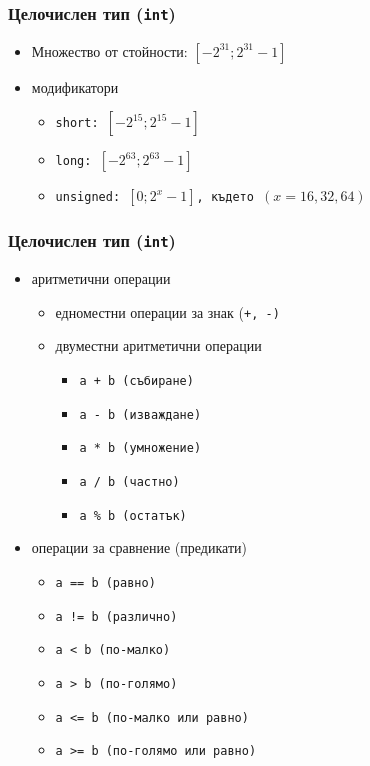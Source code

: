 \documentclass[alsotrans]{beamerswitch}
\begin{document}
\begin{frame}
  \frametitle{Целочислен тип (\texttt{int})}
  \begin{itemize}
  \item Множество от стойности: $[-2^{31}; 2^{31}-1]$
  \item модификатори
    \begin{itemize}
    \item \tt{short}:\hspace{2ex} $[-2^{15}; 2^{15}-1 ]$
    \item \tt{long}:\hspace{2ex} $[-2^{63}; 2^{63} - 1]$
    \item \tt{unsigned}:\hspace{2ex} $[0; 2^x-1 ]$, където $(x = 16, 32, 64)$
    \end{itemize}
  \end{itemize}
\end{frame}

\begin{frame}
  \frametitle{Целочислен тип (\texttt{int})}
  \begin{itemize}
  \item аритметични операции
    \begin{itemize}
    \item едноместни операции за знак (\tt+, \tt-)
    \item двуместни аритметични операции
      \begin{itemize}
      \item \tt{a + b} (събиране)
      \item \tt{a - b} (изваждане)
      \item \tt{a * b} (умножение)
      \item \tt{a / b} (частно)
      \item \tt{a \% b} (остатък)
      \end{itemize}
    \end{itemize}
  \item операции за сравнение (предикати)
    \begin{itemize}
    \item \tt{a == b} (равно)
    \item \tt{a != b} (различно)
    \item \tt{a < b} (по-малко)
    \item \tt{a > b} (по-голямо)
    \item \tt{a <= b} (по-малко или равно)
    \item \tt{a >= b} (по-голямо или равно)
    \end{itemize}
  \end{itemize}
\end{frame}
\end{document}
